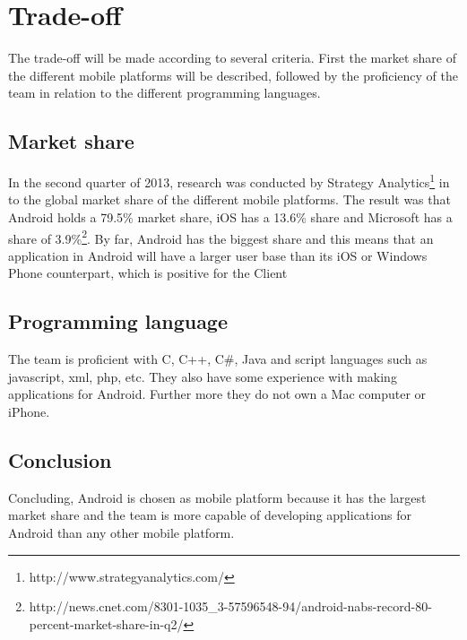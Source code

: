 \section{Trade-off}
The trade-off will be made according to several criteria. First the market share of the different mobile platforms will be described, followed by the proficiency of the team in relation to the different programming languages. 

\subsection{Market share}
In the second quarter of 2013, research was conducted by Strategy Analytics\footnote{http://www.strategyanalytics.com/} in to the global market share of the different mobile platforms. The result was that Android holds a 79.5\% market share, iOS has a 13.6\% share and Microsoft has a share of 3.9\%\footnote{http://news.cnet.com/8301-1035\_3-57596548-94/android-nabs-record-80-percent-market-share-in-q2/}.  By far, Android has the biggest share and this means that an application in Android will have a larger user base than its iOS or Windows Phone counterpart, which is positive for the Client

\subsection{Programming language}
The team is proficient with C, C++, C\#, Java and script languages such as javascript, xml, php, etc. They also have some experience with making applications for Android. Further more they do not own a Mac computer or iPhone. 

\subsection{Conclusion}
Concluding, Android is chosen as mobile platform because it has the largest market share and the team is more capable of developing applications for Android than any other mobile platform.